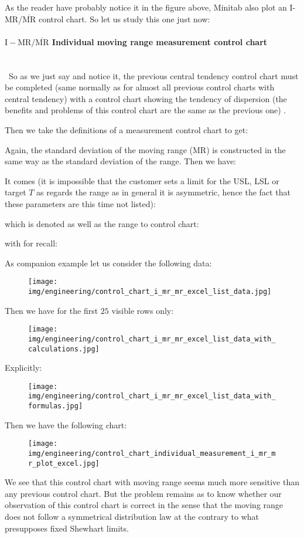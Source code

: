 	As the reader have probably notice it in the figure above, Minitab also plot an I-MR/$\overline{\text{MR}}$ control chart. So let us study this one just now:
	
	\paragraph{$\text{I}-\text{MR}/\overline{\text{MR}}$ Individual moving range measurement control chart}\mbox{}\\\
	So as we just say and notice it, the previous central tendency control chart must be completed (same normally as for almost all previous control charts with central tendency) with a control chart showing the tendency of dispersion (the benefits and problems of this control chart are the same as the previous one) .

	Then we take the definitions of a measurement control chart to get:
	
	Again, the standard deviation of the moving range (MR) is constructed in the same way as the standard deviation of the range. Then we have:
	
	It comes (it is impossible that the customer sets a limit for the USL, LSL or target $T$ as regards the range as in general it is asymmetric, hence the fact that these parameters are this time not listed):
	
	which is denoted as well as the range to control chart:
	
	with for recall:
	
	As companion example let us consider the following data:
	\begin{figure}[H]
		\centering
		\texttt{[image: img/engineering/control\_chart\_i\_mr\_mr\_excel\_list\_data.jpg]}
	\end{figure}
	Then we have for the first $25$ visible rows only:
	\begin{figure}[H]
		\centering
		\texttt{[image: img/engineering/control\_chart\_i\_mr\_mr\_excel\_list\_data\_with\_calculations.jpg]}
	\end{figure}
	Explicitly:
	\begin{figure}[H]
		\centering
		\texttt{[image: img/engineering/control\_chart\_i\_mr\_mr\_excel\_list\_data\_with\_formulas.jpg]}
	\end{figure}
	Then we have the following chart:
	\begin{figure}[H]
		\centering
		\texttt{[image: img/engineering/control\_chart\_individual\_measurement\_i\_mr\_mr\_plot\_excel.jpg]}
	\end{figure}
	We see that this control chart with moving range seems much more sensitive than any previous control chart. But the problem remains as to know whether our observation of this control chart is correct in the sense that the moving range does not follow a symmetrical distribution law at the contrary to what presupposes fixed Shewhart limits.

